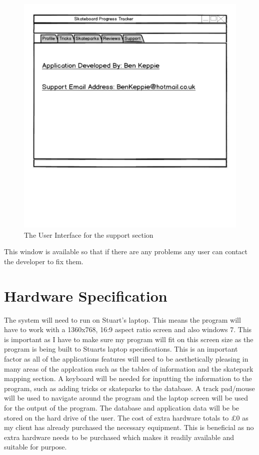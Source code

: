 \begin{figure}[H]
    \includegraphics[width=\textwidth]{./Design/SupportUI.pdf}
    \caption{The User Interface for the support section} \label{fig:Support User Interface}
\end{figure}

This window is available so that if there are any problems any user can contact the developer to fix them. 

\section{Hardware Specification}

The system will need to run on Stuart's laptop. This means the program will have to work with a 1360x768, 16:9 aspect ratio screen and also windows 7. This is important as I have to make sure my program will fit on this screen size as the program is being built to Stuarts laptop specifications. This is an important factor as all of the applications features will need to be aesthetically pleasing in many areas of the applcation such as the tables of information and the skatepark mapping section. A keyboard will be needed for inputting the information to the program, such as adding tricks or skateparks to the database. A track pad/mouse will be used to navigate around the program and the laptop screen will be used for the output of the program. The database and application data will be be stored on the hard drive of the user. The cost of extra hardware totals to £0 as my client has already purchased the necessary equipment. This is beneficial as no extra hardware needs to be purchased which makes it readily available and suitable for purpose. 

